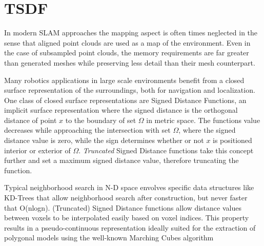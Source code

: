 \section{TSDF}

In modern SLAM approaches the mapping aspect is often times neglected in the sense that aligned point clouds are used as a map of the environment. Even in the case of subsampled point clouds, the memory requirements are far greater than generated meshes while preserving less detail than their mesh counterpart.

Many robotics applications in large scale environments benefit from a closed surface representation of the surroundings, both for navigation and localization. One class of closed surface representations are Signed Distance Functions, an implicit surface representation where the signed distance is the orthogonal distance of point $x$ to the boundary of set $\Omega$ in metric space. The functions value decreases while approaching the intersection with set $\Omega$, where the signed distance value is zero, while the sign determines whether or not $x$ is positioned interior or exterior of $\Omega$. \textit{Truncated} Signed Distance functions take this concept further and set a maximum signed distance value, therefore truncating the function. 

Typical neighborhood search in N-D space envolves specific data structures like KD-Trees that allow neighborhood search after construction, but never faster that O(nlogn). (Truncated) Signed Distance functions allow distance values between voxels to be interpolated easily based on voxel indices. This property results in a pseudo-continuous representation ideally suited for the extraction of polygonal models using the well-known Marching Cubes algorithm ~\cite{lorensen_marching_1987}

